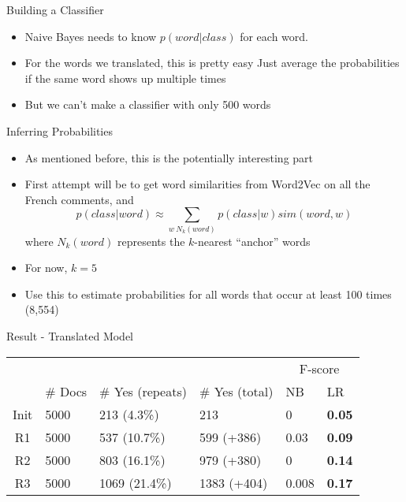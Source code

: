 \documentclass{beamer}
\begin{document}
\begin{frame}{Building a Classifier}
\begin{itemize}
\item Naive Bayes needs to know $p(word| class)$ for each word. 
\item For the words we translated, this is pretty easy
Just average the probabilities if the same word shows up multiple times
\item But we can't make a classifier with only 500 words
\end{itemize}
\end{frame}

\begin{frame}{Inferring Probabilities}
\begin{itemize}
\item As mentioned before, this is the potentially interesting part
\item First attempt will be to get word similarities from Word2Vec on all the French comments, and
\[ p(class|word) \approx \sum_{w~N_k(word)} p(class|w) sim(word,w) \]
where $N_k(word)$ represents the $k$-nearest ``anchor'' words
\item For now, $k=5$
\item Use this to estimate probabilities for all words that occur at least 100 times (8,554)
\end{itemize}
\end{frame}

\begin{frame}{Result - Translated Model}
\begin{center}
\begin{tabular}{|c|l|l|l|l|l|}
\rowcolor{gray!50} &&&& \multicolumn{2}{|c|}{F-score} \\
\rowcolor{gray!50} & \# Docs & \# Yes (repeats) & \# Yes (total) & NB & LR \\
Init & 5000 & 213 (4.3\%) & 213 & 0 & \textbf{0.05} \\
R1 & 5000 &  537 (10.7\%) & 599 (+386)& 0.03 & \textbf{0.09} \\
R2 & 5000 &  803 (16.1\%) & 979 (+380)& 0 & \textbf{0.14} \\
R3 & 5000 & 1069 (21.4\%) & 1383 (+404)& 0.008 & \textbf{0.17} \\
\end{tabular}\end{center}
\end{frame}
\end{document}
